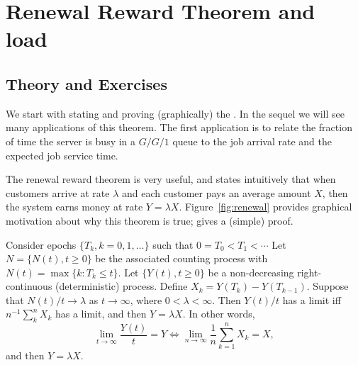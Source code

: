 \section{Renewal Reward Theorem and load}
\label{sec:renew-reward-theor}

\subsection*{Theory and Exercises}

We start with stating and proving (graphically) the .
In the sequel we will see many applications of this theorem.
The first application is to relate the fraction of time the server is busy in a $G/G/1$ queue to the job arrival rate and the expected job service time.


The renewal reward theorem is very useful, and states intuitively that when customers arrive at rate $\lambda$ and each customer pays an average amount $X$, then the system earns money at rate $Y=\lambda X$.
Figure~\ref{fig:renewal} provides graphical motivation about why this theorem is true; \citet{el-taha98:_sampl_path_analy_queuein_system} gives a (simple) proof.

\begin{theorem}[Renewal Reward Theorem, $Y=\lambda X$]
  Consider epochs $\{T_k, k=0, 1, \ldots\}$ such that  $0=T_0 < T_1 < \cdots$
  Let $N=\{N(t), t\geq 0\}$ be the associated counting process with $N(t) = \max\{k : T_k \leq t\}$.
  Let $\{Y(t), t\geq 0\}$ be a non-decreasing right-continuous (deterministic) process.
  Define $X_k = Y(T_k)-Y(T_{k-1})$.
  Suppose that $N(t)/t\to\lambda$ as $t\to\infty$, where $0<\lambda < \infty$.
  Then $Y(t)/t$ has a limit iff $n^{-1}\sum_k^n X_k$ has a limit, and then $Y=\lambda X$. In other words, 
 \begin{equation*}
   \lim_{t \to \infty} \frac{Y(t)}t=Y \iff \lim_{n \to \infty} \frac 1n\sum_{k=1}^n X_k = X, 
 \end{equation*}
and then $Y=\lambda X$. 
\end{theorem}


